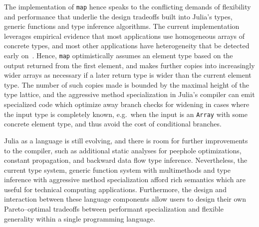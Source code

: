 \documentclass[pldi]{sigplanconf-pldi15}
\begin{document}
The implementation of \verb|map| hence speaks to the conflicting demands of
flexibility and performance that underlie the design tradeoffs built into
Julia's types, generic functions and type inference algorithms. The current
implementation leverages empirical evidence that most applications use
homogeneous arrays of concrete types, and most other applications have
heterogeneity that be detected early on~\cite{Bolz2013}. Hence, \verb|map|
optimistically assumes an element type based on the output returned from the
first element, and makes further copies into increasingly wider arrays as
necessary if a later return type is wider than the current element type. The
number of such copies made is bounded by the maximal height of the type
lattice, and the aggressive method specialization in Julia's compiler can emit
specialized code which optimize away branch checks for widening in cases where
the input type is completely known, e.g.\ when the input is an \verb|Array|
with some concrete element type, and thus avoid the cost of conditional
branches.

Julia as a language is still evolving, and there is room for further
improvements to the compiler, such as additional static analyses for peephole
optimizations, constant propagation, and backward data flow type inference.
Nevertheless, the current type system, generic function system with
multimethods and type inference with aggressive method specialization afford
rich semantics which are useful for technical computing applications.
Furthermore, the design and interaction between these language components allow
users to design their own Pareto--optimal tradeoffs between performant
specialization and flexible generality within a single programming language.


\listoftodos %



\end{document}
